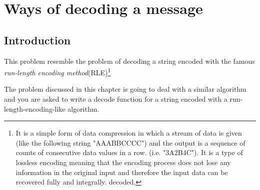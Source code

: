 %



\chapter{Ways of decoding a message}
\label{ch:decode_string}
\section*{Introduction}
This problem resemble the problem of decoding a string encoded with the famous \textit{run-length
encoding method}(RLE)\footnote{It is a simple form of data compression in
which a stream of data is given (like the following string "AAABBCCCC") 
and the output is a sequence of	counts of consecutive data values in a row. 
(i.e. "3A2B4C").
It is a type of lossless encoding meaning that the encoding process does not lose any information in the 
original input and therefore the input data can be recovered fully and integrally.
decoded.} 

The problem discussed in this chapter is going to deal with a similar algorithm and you are asked to write a 
decode function for a string encoded with a run-length-encoding-like algorithm.


